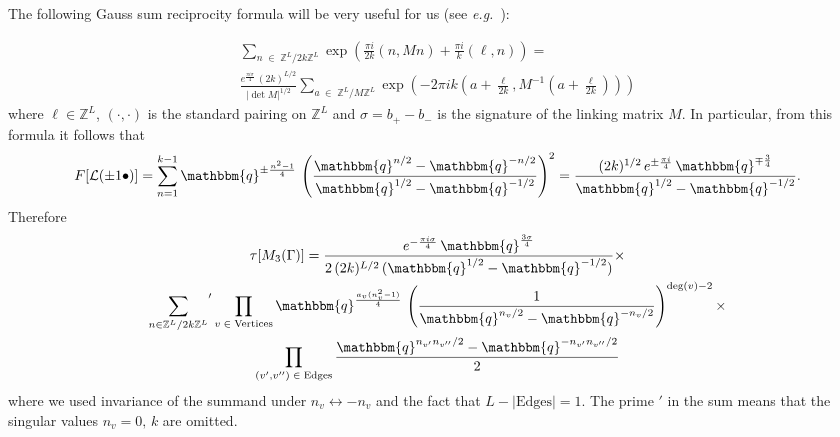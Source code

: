 \documentclass[hyper,letterpaper]{JHEP3}
\newcommand{\Z}{{\mathbb Z}}
\def\CL{{\mathcal L}}
\def\eg{{\textit{e.g.}}}
\def\q{{\mathbbm{q}}}
\begin{document}
{The following Gauss sum reciprocity formula will be very useful for us (see \eg~\cite{deloup2007reciprocity,jeffrey1992chern}):

\begin{multline}
 \sum_{n\;\in\;\Z^L/2k\Z^L}
 \exp\left(\frac{\pi i}{2k}(n,Mn)+\frac{\pi i}{k}(\ell,n)\right)
 =\\
 \frac{e^{\frac{\pi i\sigma}{4}}\,(2k)^{L/2}}{|\det M|^{1/2}}
  \sum_{a\;\in\; \Z^L/M\Z^L}
  \exp\left(-2\pi i k\left(a+\frac{\ell}{2k},M^{-1}\left(a+\frac{\ell}{2k}\right)\right)\right)
  \label{reciprocity}
\end{multline}
where $\ell \in \Z^L$, $(\cdot,\cdot)$ is the standard pairing on $\Z^L$ and $\sigma=b_+-b_-$ is the signature of the linking matrix $M$. In particular, from this formula it follows that
\begin{equation}
F[\CL(\pm 1\bullet)]=\sum_{n=1}^{k-1}\q^{\pm\frac{n^2-1}{4}}\,
\left(\frac{\q^{n/2}-\q^{-n/2}}{\q^{1/2}-\q^{-1/2}}\right)^2=
\frac{(2k)^{1/2}\,e^{\pm\frac{\pi i}{4}}\,\q^{\mp\frac{3}{4}}}{\q^{1/2}-\q^{-1/2}}.
\end{equation}
Therefore
\begin{multline}
 \tau[M_3(\Gamma)]=\frac{e^{-\frac{\pi i\sigma}{4}}\,\q^{\frac{3\sigma}{4}}}{2\,(2k)^{L/2}\,(\q^{1/2}-\q^{-1/2})}
 \times\\
 {\sum_{{n}\in \Z^L/2k\Z^L}}'\prod_{v\;\in\; \text{Vertices}}
\q^{\frac{a_v(n_v^2-1)}{4}}
\,\left(\frac{1}{\q^{n_v/2}-\q^{-n_v/2}}\right)^{\text{deg}(v)-2}
\times \\
\prod_{(v',v'')\;\in\;\text{Edges}}
\frac{\q^{n_{v'}n_{v''}/2}-\q^{-n_{v'}n_{v''}/2}}{2}
\label{WRT-Gamma-0}
\end{multline}
where we used invariance of the summand under $n_v\leftrightarrow -n_v$ and the fact that $L-|\text{Edges}|=1$. The prime $'$ in the sum means that the singular values $n_v=0,\,k$ are omitted.

}
\end{document}

